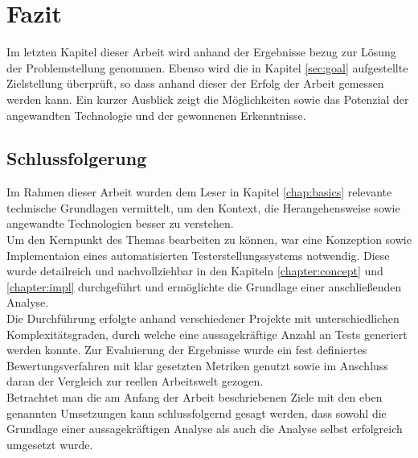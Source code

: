 \chapter{Fazit}
Im letzten Kapitel dieser Arbeit wird anhand der Ergebnisse bezug zur Lösung der Problemstellung genommen. Ebenso wird die in Kapitel \ref{sec:goal} aufgestellte Zielstellung überprüft, so dass anhand dieser der Erfolg der Arbeit gemessen werden kann. Ein kurzer Ausblick zeigt die Möglichkeiten sowie das Potenzial der angewandten Technologie und der gewonnenen Erkenntnisse.

\section{Schlussfolgerung}
Im Rahmen dieser Arbeit wurden dem Leser in Kapitel \ref{chap:basics} relevante technische Grundlagen vermittelt, um den Kontext, die Herangehensweise sowie angewandte Technologien besser zu verstehen.\\ Um den Kernpunkt des Themas bearbeiten zu können, war eine Konzeption sowie Implementaion eines automatisierten Testerstellungssystems notwendig. Diese wurde detailreich und nachvollziehbar in den Kapiteln \ref{chapter:concept} und \ref{chapter:impl} durchgeführt und ermöglichte die Grundlage einer anschließenden Analyse.\\ Die Durchführung erfolgte anhand verschiedener Projekte mit unterschiedlichen Komplexitätsgraden, durch welche eine aussagekräftige Anzahl an Tests generiert werden konnte. Zur Evaluierung der Ergebnisse wurde ein fest definiertes Bewertungsverfahren mit klar gesetzten Metriken genutzt sowie im Anschluss daran der Vergleich zur reellen Arbeitswelt gezogen.\\ Betrachtet man die am Anfang der Arbeit beschriebenen Ziele mit den eben genannten Umsetzungen kann schlussfolgernd gesagt werden, dass sowohl die Grundlage einer aussagekräftigen Analyse als auch die Analyse selbst erfolgreich umgesetzt wurde.\\\\
